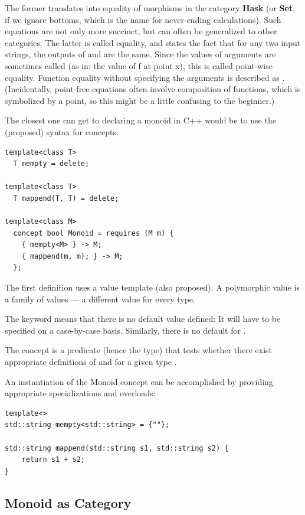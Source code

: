 The former translates into equality of morphisms in the category
\textbf{Hask} (or \textbf{Set}, if we ignore bottoms, which is the name
for never-ending calculations). Such equations are not only more
succinct, but can often be generalized to other categories. The latter
is called  equality, and states the fact that for any
two input strings, the outputs of  and \code{(++)} are
the same. Since the values of arguments are sometimes called
 (as in: the value of f at point x), this is called
point-wise equality. Function equality without specifying the arguments
is described as . (Incidentally, point-free equations
often involve composition of functions, which is symbolized by a point,
so this might be a little confusing to the beginner.)

The closest one can get to declaring a monoid in C++ would be to use the
(proposed) syntax for concepts.

\begin{verbatim}
template<class T>
  T mempty = delete;
  
template<class T>
  T mappend(T, T) = delete;
  
template<class M> 
  concept bool Monoid = requires (M m) { 
    { mempty<M> } -> M; 
    { mappend(m, m); } -> M;
  };
\end{verbatim}


The first definition uses a value template (also proposed). A
polymorphic value is a family of values --- a different value for every
type.

The keyword  means that there is no default value
defined: It will have to be specified on a case-by-case basis.
Similarly, there is no default for .

The concept  is a predicate (hence the 
type) that tests whether there exist appropriate definitions of
 and  for a given type .

An instantiation of the Monoid concept can be accomplished by providing
appropriate specializations and overloads:

\begin{verbatim}
template<>
std::string mempty<std::string> = {""};

std::string mappend(std::string s1, std::string s2) { 
    return s1 + s2;
}
\end{verbatim}

\subsection{Monoid as Category}\label{monoid-as-category}

